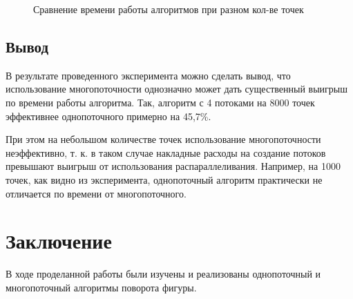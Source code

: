 \documentclass[12pt]{report}
\begin{document}
	\begin{figure}[h!]
		\begin{center}
		\end{center}
		\caption{Сравнение времени работы алгоритмов при разном кол-ве точек}
	\end{figure}

	\newpage
	
	\section{Вывод}
	
	В результате проведенного эксперимента можно сделать вывод, что использование многопоточности однозначно может дать существенный выигрыш по времени работы алгоритма. Так, алгоритм с 4 потоками на 8000 точек эффективнее однопоточного примерно на 45,7\%.
	
	При этом на небольшом количестве точек использование многопоточности неэффективно, т. к. в таком случае накладные расходы на создание потоков превышают выигрыш от использования распараллеливания. Например, на 1000 точек, как видно из эксперимента, однопоточный алгоритм практически не отличается по времени от многопоточного.
	
	\chapter*{Заключение}
	
	В ходе проделанной работы были изучены и реализованы однопоточный и многопоточный алгоритмы поворота фигуры. 
	
\end{document}
